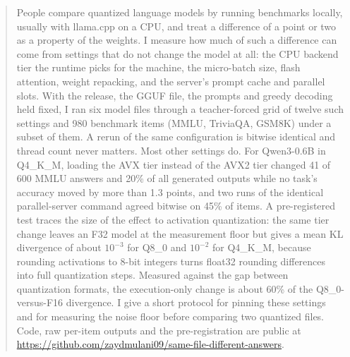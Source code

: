 \begin{abstract}
People compare quantized language models by running benchmarks locally, usually with llama.cpp
on a CPU, and treat a difference of a point or two as a property of the weights. I measure how
much of such a difference can come from settings that do not change the model at all: the CPU
backend tier the runtime picks for the machine, the micro-batch size, flash attention, weight
repacking, and the server's prompt cache and parallel slots. With the release, the GGUF file,
the prompts and greedy decoding held fixed, I ran six model files through a teacher-forced
grid of twelve such settings and 980 benchmark items (MMLU, TriviaQA, GSM8K) under a subset of
them. A rerun of the same configuration is bitwise identical and thread count never matters.
Most other settings do. For Qwen3-0.6B in Q4\_K\_M, loading the AVX tier instead of the AVX2 tier
changed 41 of 600 MMLU answers and 20\% of all generated outputs while no task's accuracy moved by
more than 1.3 points, and two runs of the identical parallel-server command agreed bitwise on 45\%
of items. A pre-registered test traces the size of the effect to activation quantization: the
same tier change leaves an F32 model at the measurement floor but gives a mean KL divergence of
about $10^{-3}$ for Q8\_0 and $10^{-2}$ for Q4\_K\_M, because rounding activations to 8-bit
integers turns float32 rounding differences into full quantization steps. Measured against the
gap between quantization formats, the execution-only change is about 60\% of the Q8\_0-versus-F16
divergence. I give a short protocol for pinning these settings and for measuring the noise floor
before comparing two quantized files. Code, raw per-item outputs and the pre-registration are
public at \url{https://github.com/zaydmulani09/same-file-different-answers}.
\end{abstract}
